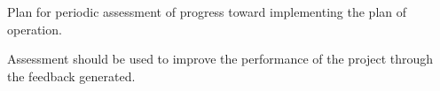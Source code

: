 Plan for periodic assessment of progress toward implementing the plan of operation.

Assessment should be used to improve the performance of the project through the feedback generated.
